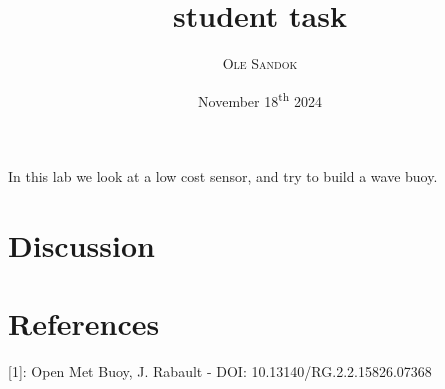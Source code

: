 \documentclass{article}
\title{student task}
\subtitle{\textit{\headcourse}}
\author{\textsc{Ole Sandok}}
\date{November 18\textsuperscript{th} 2024}
\begin{document}
\maketitle
\thispagestyle{fancy}

In this lab we look at a low cost sensor, and try to build a wave buoy. 

%

%

%

\section{Discussion}


\section{References}
[1]: Open Met Buoy, J. Rabault - DOI: 10.13140/RG.2.2.15826.07368

\end{document}
